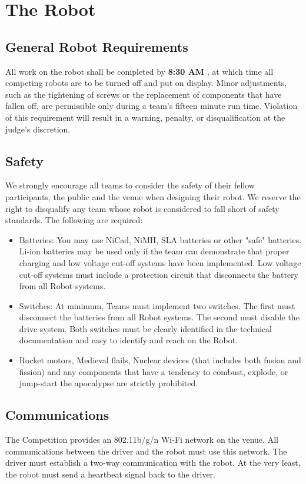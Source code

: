 \section{The Robot}
\subsection{General Robot Requirements}
All work on the robot shall be completed by \textbf{8:30 AM \competition}, at which time all competing robots are to be turned off and put on display. Minor adjustments, such as the tightening of screws or the replacement of components that have fallen off, are permissible only during a team’s fifteen minute run time. Violation of this requirement will result in a warning, penalty, or disqualification at the judge's discretion.

\subsection{Safety}
We strongly encourage all teams to consider the safety of their fellow participants, the public and the venue when designing their robot. We reserve the right to disqualify any team whose robot is considered to fall short of safety standards. The following are required:

\begin{itemize}
\item Batteries: You may use NiCad, NiMH, SLA batteries or other "safe" batteries. Li-ion batteries may be used only if the team can demonstrate that proper charging and low voltage cut-off systems have been implemented. Low voltage cut-off systems must include a protection circuit that disconnects the battery from all Robot systems.
\item Switches: At minimum, Teams must implement two switches. The first must disconnect the batteries from all Robot systems. The second must disable the drive system. Both switches must be clearly identified in the technical documentation and easy to identify and reach on the Robot. 
\item Rocket motors, Medieval flails, Nuclear devices (that includes both fusion and fission) and any components that have a tendency to combust, explode, or jump-start the apocalypse are strictly prohibited.
\end{itemize}

\subsection{Communications}
The Competition provides an 802.11b/g/n Wi-Fi network on the venue. All communications between the driver and the robot must use this network. The driver must establish a two-way communication with the robot. At the very least, the robot must send a heartbeat signal back to the driver.

